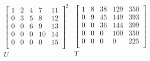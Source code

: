 \documentclass[../thesis]{subfiles}
\begin{document}
		\begin{equation}
			\begin{array}{c}
				\begin{bmatrix}
					 1 &  2 &  4 &  7 & 11  \\
					 0 &  3 &  5 &  8 & 12  \\
					 0 &  0 &  6 &  9 & 13  \\
					 0 &  0 &  0 & 10 & 14  \\
					 0 &  0 &  0 &  0 & 15  \\
				\end{bmatrix}^2  \\
				U
			\end{array}
			\begin{array}{c}
				\begin{bmatrix}
					  1 &   8 &  38 & 129 & 350  \\
					  0 &   9 &  45 & 149 & 393  \\
					  0 &   0 &  36 & 144 & 399  \\
					  0 &   0 &   0 & 100 & 350  \\
					  0 &   0 &   0 &   0 & 225  \\
				\end{bmatrix}  \\
				T
			\end{array}
			\label{eq:example:5x5}
		\end{equation}
\end{document}
